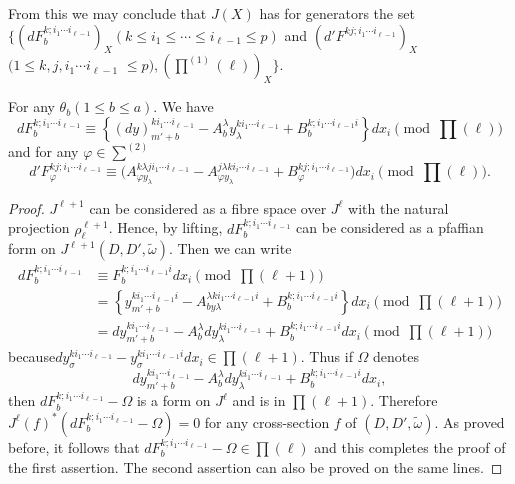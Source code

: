 From this we may conclude that $J(X)$ has for generators the set $\Big\{
(dF^{k;i_1  \cdots i_{\ell -1 }}_b)_X (k \leq i_1 \leq \cdots \leq i_{\ell
  -1} \leq p)$ and $\left(d'F^{kj;i_1  \cdots i_{\ell -1}}\right)_X$ $(1 \leq k ,
j, i_1 \cdots i_{\ell -1}$ $\leq p), (\prod ^{(1)} (\ell))_X\Big\}$. 

\begin{proposition}\label{chap3:sec3.6:prop10}%
  For any $\theta_b (1 \leq b \leq a)$. We have
  $$
  dF^{k;i_1  \cdots i_{\ell-1}}_b \equiv \left\{ (dy)^{ki_1 \cdots i_{\ell
      -1}}_{m'+b}- A^{\lambda}_b y_{\lambda}^{ki_1 \cdots i_{\ell-1}}
  + B_b ^{k;i_1 \cdots i_{\ell-1} i} \right\} dx_i \pmod {\prod (\ell)} 
  $$
  and for any $\varphi \in \sum ^{(2)}$
  $$
  d'F^{kj;i_1  \cdots i_{\ell-1}}_\varphi \equiv \bigg (A^{k \lambda
    ji_1 \cdots i_{\ell -1}}_{\varphi y _{\lambda}} - A^{j \lambda
    ki_i \cdots i_{\ell -1}}_{\varphi y _{\lambda}} + B^{kj; i_1
    \cdots i_{\ell-1}}_{\varphi}  \bigg ) dx_i \pmod {\prod (\ell)}. 
  $$
\end{proposition}

\begin{proof}
  $J^{\ell +1}$ can be considered as a fibre space over $J^{\ell}$
  with the natural projection $\rho^{\ell +1}_{\ell}$. Hence, by
  lifting, $dF_{b}^{k ; i_1 \cdots i_{\ell -1}}$ can be considered as
  a pfaffian form on $J^{\ell +1} (D, D', \tilde{\omega})$. Then we
  can write  
  \begin{align*}
    dF_{b}^{k;i_1 \cdots i_{\ell -1}} & \equiv F_{b}^{k;i_1 \cdots
      i_{\ell -1}i} dx_i \pmod {\prod (\ell +1)}\\ 
    & = \left\{y_{m'+b}^{ki_1 \cdots i_{\ell -1}i}-A^{\lambda ki_1 \cdots
      i_{\ell-1}i}_{b y \lambda} + B_{b}^{k;i_1 \cdots i_{\ell -1}i}
    \right\} dx_i \pmod {\prod (\ell+1)}\\ 
    & = dy_{m'+b}^{ki_1 \cdots i_{\ell -1}} - A^{\lambda}_{b}
    dy_{\lambda}^{ki_1 \cdots i_{\ell -1}} + B_{b}^{k;i_1 \cdots
      i_{\ell -1}i} dx_i \pmod {\prod (\ell +1)} 
  \end{align*}
  because\pageoriginale $dy_{\sigma}^{ki_1 \cdots i_{\ell -1}} - y_{\sigma}^{ki_1
    \cdots i_{\ell -1}i} dx_i \in \prod (\ell +1)$. Thus if $\Omega$
  denotes  
  $$
  dy_{m'+b}^{ki_1 \cdots i_{\ell -1}} -A^{\lambda}_{b}
  dy_{\lambda}^{ki_1 \cdots i_{\ell -1}} + B_{b}^{k;i_1 \cdots i_{\ell
      -1}i} dx_i, 
  $$
  then $dF_{b}^{k;i_1 \cdots i_{\ell -1}} - \Omega$ is a form on
  $J^{\ell}$ and is in $\prod (\ell +1)$. Therefore $J^{\ell} (f)^*
  (dF_{b}^{k;i_1 \cdots i_{\ell -1}}- \Omega) =0$ for any
  cross-section $f$ of $(D,D', \tilde{\omega})$. As proved before, it
  follows that $dF_{b}^{k;i_1 \cdots i_{\ell -1}} - \Omega \in \prod
  (\ell)$ and this completes the proof of the first assertion. The
  second assertion can also be proved on the same lines. 
\end{proof}

